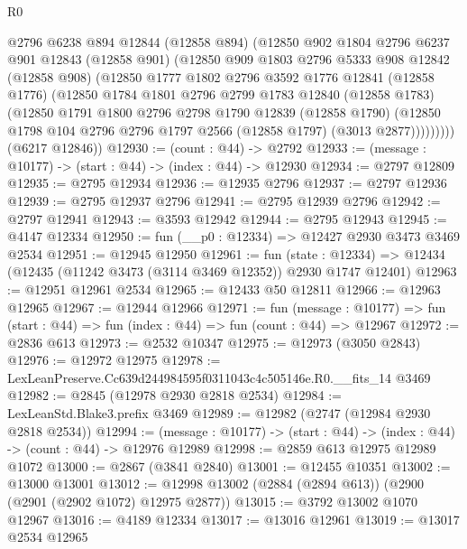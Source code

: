 \begin{lexlean}{R0}
\begin{coremodule}
          @2796
          @6238
          @894
          @12844
          (@12858 @894)
          (@12850
            @902
            @1804
            @2796
            @6237
            @901
            @12843
            (@12858 @901)
            (@12850
              @909
              @1803
              @2796
              @5333
              @908
              @12842
              (@12858 @908)
              (@12850
                @1777
                @1802
                @2796
                @3592
                @1776
                @12841
                (@12858 @1776)
                (@12850
                  @1784
                  @1801
                  @2796
                  @2799
                  @1783
                  @12840
                  (@12858 @1783)
                  (@12850
                    @1791
                    @1800
                    @2796
                    @2798
                    @1790
                    @12839
                    (@12858 @1790)
                    (@12850 @1798 @104 @2796 @2796 @1797 @2566 (@12858 @1797) (@3013 @2877)))))))))
      (@6217 @12846))
@12930 := (count : @44) -> @2792
@12933 := (message : @10177) -> (start : @44) -> (index : @44) -> @12930
@12934 := @2797 @12809
@12935 := @2795 @12934
@12936 := @12935 @2796
@12937 := @2797 @12936
@12939 := @2795 @12937 @2796
@12941 := @2795 @12939 @2796
@12942 := @2797 @12941
@12943 := @3593 @12942
@12944 := @2795 @12943
@12945 := @4147 @12334
@12950 := fun (__p0 : @12334) => @12427 @2930 @3473 @3469 @2534
@12951 := @12945 @12950
@12961 := fun (state : @12334) =>
  @12434 (@12435 (@11242 @3473 (@3114 @3469 @12352)) @2930 @1747 @12401)
@12963 := @12951 @12961 @2534
@12965 := @12433 @50 @12811
@12966 := @12963 @12965
@12967 := @12944 @12966
@12971 := fun (message : @10177) =>
  fun (start : @44) => fun (index : @44) => fun (count : @44) => @12967
@12972 := @2836 @613
@12973 := @2532 @10347
@12975 := @12973 (@3050 @2843)
@12976 := @12972 @12975
@12978 := LexLeanPreserve.Cc639d244984595f0311043c4c505146e.R0.__fits_14 @3469
@12982 := @2845 (@12978 @2930 @2818 @2534)
@12984 := LexLeanStd.Blake3.prefix @3469
@12989 := @12982 (@2747 (@12984 @2930 @2818 @2534))
@12994 := (message : @10177) -> (start : @44) -> (index : @44) -> (count : @44) -> @12976 @12989
@12998 := @2859 @613 @12975 @12989 @1072
@13000 := @2867 (@3841 @2840)
@13001 := @12455 @10351
@13002 := @13000 @13001
@13012 := @12998 @13002 (@2884 (@2894 @613)) (@2900 (@2901 (@2902 @1072) @12975 @2877))
@13015 := @3792 @13002 @1070 @12967
@13016 := @4189 @12334
@13017 := @13016 @12961
@13019 := @13017 @2534 @12965

\end{coremodule}
\end{lexlean}
